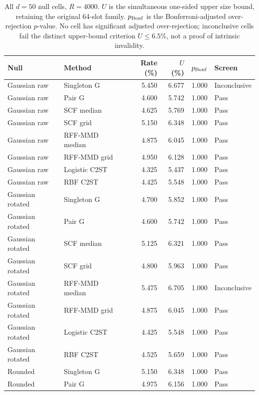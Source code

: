 {\color{blue}
\begin{table}[t]
\color{blue}
\centering
\scriptsize
\caption{All $d=50$ null cells, $R=4000$. $U$ is the simultaneous one-sided upper size bound, retaining the original 64-slot family. $p_{\rm Bonf}$ is the Bonferroni-adjusted over-rejection $p$-value. No cell has significant adjusted over-rejection; inconclusive cells fail the distinct upper-bound criterion $U\leq6.5\%$, not a proof of intrinsic invalidity.}
\label{tab:comparator-null-d50}
\setlength{\tabcolsep}{8pt}
\renewcommand{\arraystretch}{1.2}
\begin{tabular}{llrrrl}
\toprule
Null & Method & Rate (\%) & $U$ (\%) & $p_{\rm Bonf}$ & Screen\\
\midrule
Gaussian raw & Singleton G & 5.450 & 6.677 & 1.000 & Inconclusive \\
Gaussian raw & Pair G & 4.600 & 5.742 & 1.000 & Pass \\
Gaussian raw & SCF median & 4.625 & 5.769 & 1.000 & Pass \\
Gaussian raw & SCF grid & 5.150 & 6.348 & 1.000 & Pass \\
Gaussian raw & RFF-MMD median & 4.875 & 6.045 & 1.000 & Pass \\
Gaussian raw & RFF-MMD grid & 4.950 & 6.128 & 1.000 & Pass \\
Gaussian raw & Logistic C2ST & 4.325 & 5.437 & 1.000 & Pass \\
Gaussian raw & RBF C2ST & 4.425 & 5.548 & 1.000 & Pass \\
Gaussian rotated & Singleton G & 4.700 & 5.852 & 1.000 & Pass \\
Gaussian rotated & Pair G & 4.600 & 5.742 & 1.000 & Pass \\
Gaussian rotated & SCF median & 5.125 & 6.321 & 1.000 & Pass \\
Gaussian rotated & SCF grid & 4.800 & 5.963 & 1.000 & Pass \\
Gaussian rotated & RFF-MMD median & 5.475 & 6.705 & 1.000 & Inconclusive \\
Gaussian rotated & RFF-MMD grid & 4.875 & 6.045 & 1.000 & Pass \\
Gaussian rotated & Logistic C2ST & 4.425 & 5.548 & 1.000 & Pass \\
Gaussian rotated & RBF C2ST & 4.525 & 5.659 & 1.000 & Pass \\
Rounded & Singleton G & 5.150 & 6.348 & 1.000 & Pass \\
Rounded & Pair G & 4.975 & 6.156 & 1.000 & Pass \\

\end{tabular}
\end{table}}
